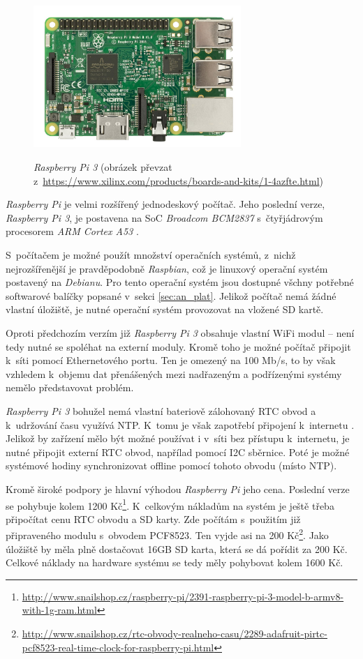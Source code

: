 \begin{figure}[h!]
    \centering
    \includegraphics[width=0.7\textwidth]{images/rpi.jpg}
    \label{fig:rpi}
    \caption[\textit{Raspberry Pi 3}]{\textit{Raspberry Pi 3} (obrázek převzat z~\url{https://www.xilinx.com/products/boards-and-kits/1-4azfte.html})}
\end{figure}

\textit{Raspberry Pi} je velmi rozšířený jednodeskový počítač. Jeho poslední verze, \textit{Raspberry Pi 3}, je postavena na SoC \textit{Broadcom BCM2837} s~čtyřjádrovým procesorem \textit{ARM Cortex A53} \cite{rpi_benchoff}.

S~počítačem je možné použít množství operačních systémů, z~nichž nejrozšířenější je pravděpodobně \textit{Raspbian}, což je linuxový operační systém postavený na \textit{Debianu}. Pro tento operační systém jsou dostupné všchny potřebné softwarové balíčky popsané v~sekci \ref{sec:an_plat}. Jelikož počítač nemá žádné vlastní úložiště, je nutné operační systém provozovat na vložené SD kartě.

Oproti předchozím verzím již \textit{Raspberry Pi 3} obsahuje vlastní WiFi modul \cite{rpi_benchoff} -- není tedy nutné se spoléhat na externí moduly. Kromě toho je možné počítač připojit k~síti pomocí Ethernetového portu. Ten je omezený na 100 Mb/s, to by však vzhledem k~objemu dat přenášených mezi nadřazeným a podřízenými systémy nemělo představovat problém. 

\textit{Raspberry Pi 3} bohužel nemá vlastní bateriově zálohovaný RTC obvod a k~udržování času využívá NTP. K~tomu je však zapotřebí připojení k~internetu \cite{rpi_rtc_ada}. Jelikož by zařízení mělo být možné používat i v~síti bez přístupu k~internetu, je nutné připojit externí RTC obvod, napřílad pomocí I2C sběrnice. Poté je možné systémové hodiny synchronizovat offline pomocí tohoto obvodu (místo NTP).

Kromě široké podpory je hlavní výhodou \textit{Raspberry Pi} jeho cena. Poslední verze se pohybuje kolem 1200 Kč\footnote{\url{http://www.snailshop.cz/raspberry-pi/2391-raspberry-pi-3-model-b-armv8-with-1g-ram.html}}. K~celkovým nákladům na systém je ještě třeba připočítat cenu RTC obvodu a SD karty. Zde počítám s~použitím již připraveného modulu s~obvodem PCF8523. Ten vyjde asi na 200 Kč\footnote{\url{http://www.snailshop.cz/rtc-obvody-realneho-casu/2289-adafruit-pirtc-pcf8523-real-time-clock-for-raspberry-pi.html}}. Jako úložiště by měla plně dostačovat 16GB SD karta, která se dá pořídit za 200 Kč. Celkové náklady na hardware systému se tedy měly pohybovat kolem 1600 Kč.

